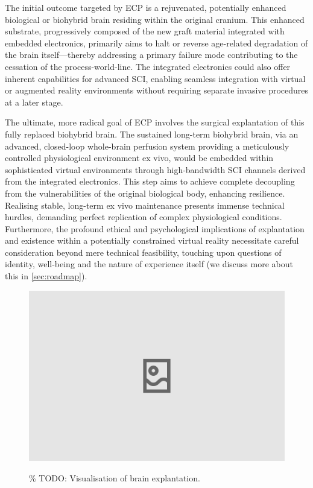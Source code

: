 \documentclass[10pt]{article}
\begin{document}
\begin{sloppypar}
  The initial outcome targeted by ECP is a rejuvenated, potentially enhanced biological or biohybrid brain residing within the original cranium. This enhanced substrate, progressively composed of the new graft material integrated with embedded electronics, primarily aims to halt or reverse age-related degradation of the brain itself—thereby addressing a primary failure mode contributing to the cessation of the process-world-line. The integrated electronics could also offer inherent capabilities for advanced SCI, enabling seamless integration with virtual or augmented reality environments without requiring separate invasive procedures at a later stage.

  The ultimate, more radical goal of ECP involves the surgical explantation of this fully replaced biohybrid brain. The sustained long-term biohybrid brain, via an advanced, closed-loop whole-brain perfusion system providing a meticulously controlled physiological environment ex vivo, would be embedded within sophisticated virtual environments through high-bandwidth SCI channels derived from the integrated electronics. This step aims to achieve complete decoupling from the vulnerabilities of the original biological body, enhancing resilience. Realising stable, long-term ex vivo maintenance presents immense technical hurdles, demanding perfect replication of complex physiological conditions. Furthermore, the profound ethical and psychological implications of explantation and existence within a potentially constrained virtual reality necessitate careful consideration beyond mere technical feasibility, touching upon questions of identity, well-being and the nature of experience itself (we discuss more about this in \autoref{sec:roadmap}).

  \begin{figure}[ht]
    \centering
    \includegraphics[width=\textwidth]{figures/ecp-brain-explant.png}
    \label{fig:ecp-brain-explant}
    \caption{\% TODO: Visualisation of brain explantation.}
  \end{figure}


\end{sloppypar}
\end{document}
